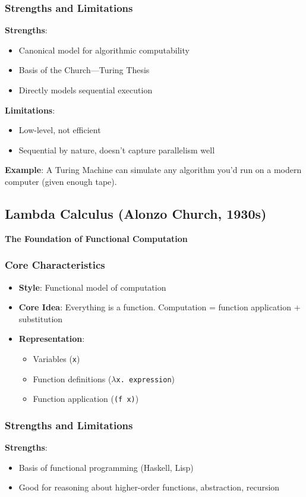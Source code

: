 \subsubsection{Strengths and Limitations}
\textbf{Strengths}:
\begin{itemize}
    \item Canonical model for algorithmic computability
    \item Basis of the Church---Turing Thesis
    \item Directly models sequential execution
\end{itemize}

\textbf{Limitations}:
\begin{itemize}
    \item Low-level, not efficient
    \item Sequential by nature, doesn't capture parallelism well
\end{itemize}

\textbf{Example}: A Turing Machine can simulate any algorithm you'd run on a modern computer (given enough tape).

\subsection{Lambda Calculus (Alonzo Church, 1930s)}
\textbf{The Foundation of Functional Computation}

\subsubsection{Core Characteristics}
\begin{itemize}
    \item \textbf{Style}: Functional model of computation
    \item \textbf{Core Idea}: Everything is a function. Computation = function application + substitution
    \item \textbf{Representation}:
    \begin{itemize}
        \item Variables (\texttt{x})
        \item Function definitions (\texttt{$\lambda$x. expression})
        \item Function application (\texttt{(f x)})
    \end{itemize}
\end{itemize}

\subsubsection{Strengths and Limitations}
\textbf{Strengths}:
\begin{itemize}
    \item Basis of functional programming (Haskell, Lisp)
    \item Good for reasoning about higher-order functions, abstraction, recursion
\end{itemize}

